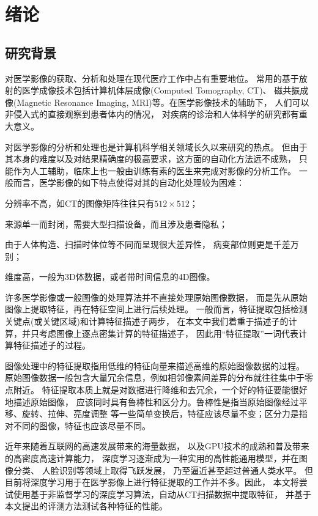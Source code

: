 
\chapter{绪论\label{chap:intro}}

\section{研究背景}
对医学影像的获取、分析和处理在现代医疗工作中占有重要地位。
常用的基于放射的医学成像技术包括计算机体层成像(Computed Tomography, CT)、
磁共振成像(Magnetic Resonance Imaging, MRI)等。在医学影像技术的辅助下，
人们可以非侵入式的直接观察到患者体内的情况，
对疾病的诊治和人体科学的研究都有重大意义。

对医学影像的分析和处理也是计算机科学相关领域长久以来研究的热点。
但由于其本身的难度以及对结果精确度的极高要求，这方面的自动化方法远不成熟，
只能作为人工辅助，临床上也一般由训练有素的医生来完成对影像的分析工作。
一般而言，医学影像的如下特点使得对其的自动化处理较为困难：
\begin{inparaenum}[(1)]
    \item 分辨率不高，如CT的图像矩阵往往只有$512\times 512$\cite{medimging2}；
    \item 来源单一而封闭，需要大型扫描设备，而且涉及患者隐私；
    \item 由于人体构造、扫描时体位等不同而呈现很大差异性，
        病变部位则更是千差万别；
    \item 维度高，一般为3D体数据，或者带时间信息的4D图像。
\end{inparaenum}

许多医学影像或一般图像的处理算法并不直接处理原始图像数据，
而是先从原始图像上提取特征，再在特征空间上进行后续处理。
一般而言，特征提取包括检测关键点(或关键区域)和计算特征描述子两步，
在本文中我们着重于描述子的计算，并只考虑图像上逐点密集计算的特征描述子，
因此用``特征提取''一词代表计算特征描述子的过程。

图像处理中的特征提取指用低维的特征向量来描述高维的原始图像数据的过程。
原始图像数据一般包含大量冗余信息，例如相邻像素间差异的分布就往往集中于零点附近。
特征提取本质上就是对数据进行降维和去冗余，一个好的特征要能很好地描述原始图像，
应该同时具有鲁棒性和区分力。鲁棒性是指当原始图像经过平移、旋转、拉伸、亮度调整
等一些简单变换后，特征应该尽量不变；区分力是指对不同的图像，特征也应该尽量不同。

近年来随着互联网的高速发展带来的海量数据，
以及GPU技术的成熟和普及带来的高密度高速计算能力，
深度学习逐渐成为一种实用的高性能通用模型，并在图像分类\cite{he2015delving}、
人脸识别\cite{schroff2015facenet}等领域上取得飞跃发展，
乃至逼近甚至超过普通人类水平。
但目前将深度学习用于在医学影像上进行特征提取的工作并不多。因此，
本文将尝试使用基于非监督学习的深度学习算法，自动从CT扫描数据中提取特征，
并基于本文提出的评测方法测试各种特征的性能。

